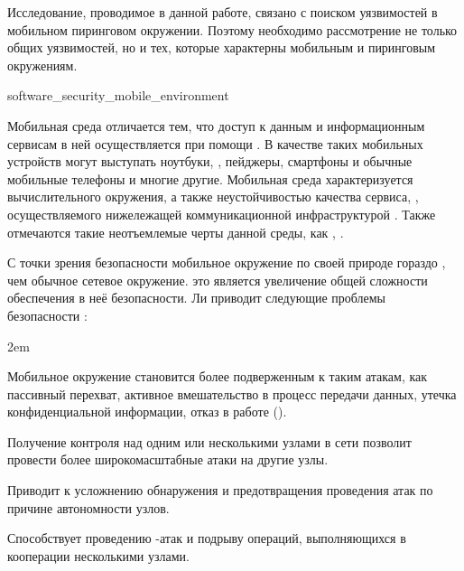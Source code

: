 %
Исследование, проводимое в данной работе, связано с поиском уязвимостей в мобильном пиринговом окружении. 
%
Поэтому необходимо рассмотрение не только общих уязвимостей, но и тех, которые характерны мобильным и пиринговым окружениям. 

	{software_security_mobile_environment}

%
Мобильная среда отличается тем, что доступ к данным и информационным сервисам в ней осуществляется при помощи  . 
%
В качестве таких мобильных устройств могут выступать ноутбуки, , пейджеры, смартфоны и обычные мобильные телефоны и многие другие.
%
Мобильная среда характеризуется  вычислительного окружения, а также неустойчивостью качества сервиса, , осуществляемого нижележащей коммуникационной инфраструктурой 
. 
%
Также отмечаются такие неотъемлемые черты данной среды, как ,  . 

%
С точки зрения безопасности мобильное окружение по своей природе гораздо , чем обычное сетевое окружение. 
%
 это является увеличение общей сложности обеспечения в неё безопасности. 
%
Ли приводит следующие проблемы безопасности : 
\begin{description}
	\leftskip2em%
	\setlength{\itemsep}{0pt}%
	\setlength{\parsep}{0pt}%

	\item[Отсутствие границ безопасности.] Мобильное окружение становится более подверженным к таким атакам, как пассивный перехват, активное вмешательство в процесс передачи данных, утечка конфиденциальной информации, отказ в работе ().

	\item[Угроза со стороны скомпрометированных узлов.] Получение контроля над одним или несколькими узлами в сети позволит провести более широкомасштабные атаки на другие узлы. 

	\item[Отсутствие централизованного средства управления.] Приводит к усложнению обнаружения и предотвращения проведения атак по причине автономности узлов.

	\item[Ограниченное электропитание.] Способствует проведению -атак и подрыву операций, выполняющихся в кооперации несколькими узлами. 
\end{description}

